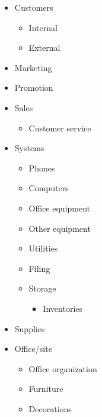 \documentclass[10pt,landscape]{article}
\begin{document}
\begin{multicols}{3}
\begin{itemize}
\begin{itemize}
\end{itemize}

\item Customers \begin{itemize}
\item Internal 
\item External 

\end{itemize}

\item Marketing 
\item Promotion 
\item Sales \begin{itemize}
\item Customer service 

\end{itemize}

\item Systems \begin{itemize}
\item Phones 
\item Computers 
\item Office equipment 
\item Other equipment 
\item Utilities 
\item Filing 
\item Storage \begin{itemize}
\item Inventories 

\end{itemize}


\end{itemize}

\item Supplies 
\item Office/site \begin{itemize}
\item Office organization 
\item Furniture 
\item Decorations 

\end{itemize}


\end{itemize}
\end{multicols}
\end{document}
